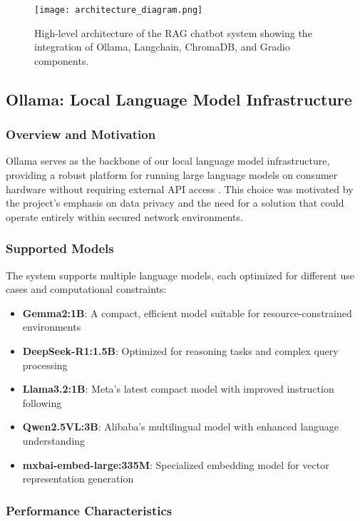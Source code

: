 \begin{figure}[H]
    \centering
    \texttt{[image: architecture\_diagram.png]}
    \caption{High-level architecture of the RAG chatbot system showing the integration of Ollama, Langchain, ChromaDB, and Gradio components.}
    \label{fig:architecture}
\end{figure}

\subsection{Ollama: Local Language Model Infrastructure}

\subsubsection{Overview and Motivation}

Ollama serves as the backbone of our local language model infrastructure, providing a robust platform for running large language models on consumer hardware without requiring external API access \citep{ollama2024}. This choice was motivated by the project's emphasis on data privacy and the need for a solution that could operate entirely within secured network environments.

\subsubsection{Supported Models}

The system supports multiple language models, each optimized for different use cases and computational constraints:

\begin{itemize}
    \item \textbf{Gemma2:1B}: A compact, efficient model suitable for resource-constrained environments
    \item \textbf{DeepSeek-R1:1.5B}: Optimized for reasoning tasks and complex query processing
    \item \textbf{Llama3.2:1B}: Meta's latest compact model with improved instruction following
    \item \textbf{Qwen2.5VL:3B}: Alibaba's multilingual model with enhanced language understanding
    \item \textbf{mxbai-embed-large:335M}: Specialized embedding model for vector representation generation
\end{itemize}

\subsubsection{Performance Characteristics}

